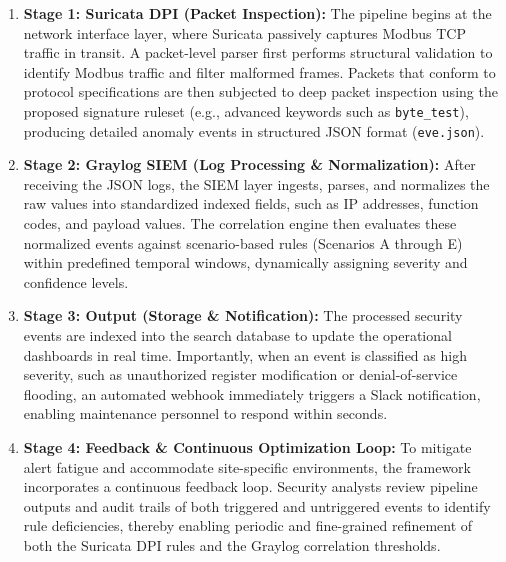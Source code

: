 \begin{enumerate}
    \newpage
    \item \textbf{Stage 1: Suricata DPI (Packet Inspection):} The pipeline begins at the network interface layer, where Suricata passively captures Modbus TCP traffic in transit. A packet-level parser first performs structural validation to identify Modbus traffic and filter malformed frames. Packets that conform to protocol specifications are then subjected to deep packet inspection using the proposed signature ruleset (e.g., advanced keywords such as \texttt{byte\_test}), producing detailed anomaly events in structured JSON format (\texttt{eve.json}).
    \item \textbf{Stage 2: Graylog SIEM (Log Processing \& Normalization):} After receiving the JSON logs, the SIEM layer ingests, parses, and normalizes the raw values into standardized indexed fields, such as IP addresses, function codes, and payload values. The correlation engine then evaluates these normalized events against scenario-based rules (Scenarios A through E) within predefined temporal windows, dynamically assigning severity and confidence levels.

    \item \textbf{Stage 3: Output (Storage \& Notification):} The processed security events are indexed into the search database to update the operational dashboards in real time. Importantly, when an event is classified as high severity, such as unauthorized register modification or denial-of-service flooding, an automated webhook immediately triggers a Slack notification, enabling maintenance personnel to respond within seconds.

    \item \textbf{Stage 4: Feedback \& Continuous Optimization Loop:} To mitigate alert fatigue and accommodate site-specific environments, the framework incorporates a continuous feedback loop. Security analysts review pipeline outputs and audit trails of both triggered and untriggered events to identify rule deficiencies, thereby enabling periodic and fine-grained refinement of both the Suricata DPI rules and the Graylog correlation thresholds.
\end{enumerate}

\noindent
